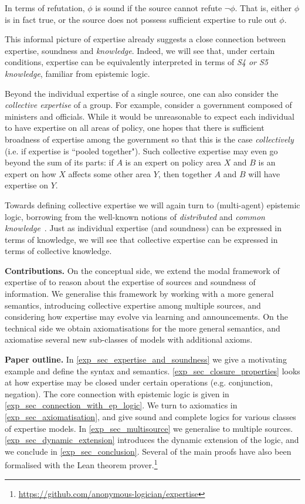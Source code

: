 In terms of refutation, $\phi$ is sound if the source cannot refute $\neg\phi$.
That is, either $\phi$ is in fact true, or the source does not possess
sufficient expertise to rule out $\phi$.

This informal picture of expertise already suggests a close connection between
expertise, soundness and \emph{knowledge}. Indeed, we will see that, under
certain conditions, expertise can be equivalently interpreted in terms of
\emph{S4 or S5 knowledge}, familiar from epistemic logic.

Beyond the individual expertise of a single source, one can also consider the
\emph{collective expertise} of a group. For example, consider a government
composed of ministers and officials. While it would be unreasonable to expect
each individual to have expertise on all areas of policy, one hopes that there
is sufficient broadness of expertise among the government so that this is the
case \emph{collectively} (i.e. if expertise is ``pooled together"). Such
collective expertise may even go beyond the sum of its parts: if $A$ is an
expert on policy area $X$ and $B$ is an expert on how $X$ affects some other
area $Y$, then together $A$ and $B$ will have expertise on $Y$.

Towards defining collective expertise we will again turn to (multi-agent)
epistemic logic, borrowing from the well-known notions of \emph{distributed}
and \emph{common knowledge}~\cite{fagin2003reasoning}. Just as individual
expertise (and soundness) can be expressed in terms of knowledge, we will see
that collective expertise can be expressed in terms of collective knowledge.


\textbf{Contributions.} On the conceptual side, we extend the modal framework
of expertise of \textcite{singleton2021logic} to reason about the expertise of
sources and soundness of information. We generalise this framework by working
with a more general semantics, introducing collective expertise among
multiple sources, and considering how expertise may evolve via learning and
announcements.
%
On the technical side we obtain axiomatisations for the more general semantics,
and axiomatise several new sub-classes of models with additional axioms.

\textbf{Paper outline.} In \cref{exp_sec_expertise_and_soundness} we give a
motivating example and define the syntax and semantics.
\cref{exp_sec_closure_properties} looks at how expertise may be closed under
certain operations (e.g. conjunction, negation). The core connection with
epistemic logic is given in \cref{exp_sec_connection_with_ep_logic}. We turn to
axiomatics in \cref{exp_sec_axiomatisation}, and give sound and complete logics for
various classes of expertise models. In \cref{exp_sec_multisource} we generalise to
multiple sources. \cref{exp_sec_dynamic_extension} introduces the dynamic extension
of the logic, and we conclude in \cref{exp_sec_conclusion}. Several of the main
proofs have also been formalised with the Lean theorem
prover.\footnote{\url{https://github.com/anonymous-logician/expertise}}

